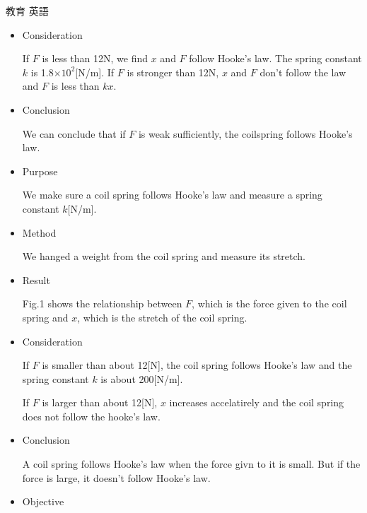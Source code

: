 \documentclass[fleqn]{jbook}
\begin{document}
\begin{answer}{教育 英語}{}
\begin{subanswers}
\begin{subsubanswers}
\begin{itemize}
\item Consideration

If \( F\) is less than 12N, we find \( x\) and \( F\) follow Hooke's law.
The spring constant \( k\) is 1.8\( \times 10^{2}\)[N/m]. If \( F\) is 
stronger than 12N, \( x\) and \( F\) don't follow the law and \( F\) is
less than \( kx\).



\item Conclusion

We can conclude that if \( F\) is weak sufficiently, the coilspring follows
Hooke's law.

\end{itemize}
\SubSubAnswer

\begin{itemize}
\item Purpose

We make sure a coil spring follows Hooke's law and measure a spring constant
\( k\)[N/m].



\item Method

We hanged a weight from the coil spring and measure its stretch.



\item Result

Fig.1 shows the relationship between \( F\), which is the force given to the
coil spring and \( x\), which is the stretch of the coil spring.



\item Consideration

If \( F\) is smaller than about 12[N], the coil spring follows Hooke's law 
and the spring constant \( k\) is about 200[N/m].


If \( F\) is larger than about 12[N], \( x\) increases accelatirely and the
coil spring does not follow the hooke's law.



\item Conclusion

A coil spring follows Hooke's law when the force givn to it is small. But
if the force is large, it doesn't follow Hooke's law.

\end{itemize}

\SubSubAnswer
\begin{itemize}
\item Objective


\end{itemize}
\end{subsubanswers}
\end{subanswers}
\end{answer}
\end{document}
